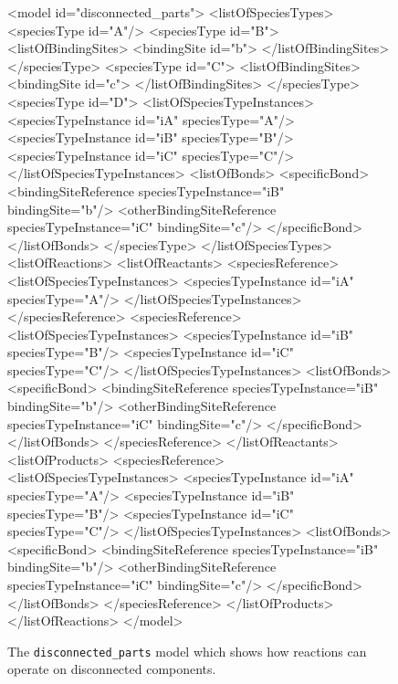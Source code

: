 \documentclass{cekarticle}
\begin{document}
\begin{figure}[h]
\begin{example}
<model id="disconnected_parts">
    <listOfSpeciesTypes>
        <speciesType id="A"/>
        <speciesType id="B">
            <listOfBindingSites>
                <bindingSite id="b">
            </listOfBindingSites>
        </speciesType>
        <speciesType id="C">
            <listOfBindingSites>
                <bindingSite id="c">
            </listOfBindingSites>
        </speciesType>
        <speciesType id="D">
            <listOfSpeciesTypeInstances>
                <speciesTypeInstance id="iA" speciesType="A"/>
                <speciesTypeInstance id="iB" speciesType="B"/>
                <speciesTypeInstance id="iC" speciesType="C"/>
            </listOfSpeciesTypeInstances>
            <listOfBonds>
                <specificBond>
                    <bindingSiteReference speciesTypeInstance="iB" bindingSite="b"/>
                    <otherBindingSiteReference speciesTypeInstance="iC" bindingSite="c"/>
                </specificBond>
            </listOfBonds>
        </speciesType>
    </listOfSpeciesTypes>
    <listOfReactions>
        <listOfReactants>
            <speciesReference>
                <listOfSpeciesTypeInstances>
                    <speciesTypeInstance id="iA" speciesType="A"/>
                 </listOfSpeciesTypeInstances>
            </speciesReference>
            <speciesReference>
                <listOfSpeciesTypeInstances>
                    <speciesTypeInstance id="iB" speciesType="B"/>
                    <speciesTypeInstance id="iC" speciesType="C"/>
                </listOfSpeciesTypeInstances>
                <listOfBonds>
                    <specificBond>
                        <bindingSiteReference speciesTypeInstance="iB" bindingSite="b"/>
                        <otherBindingSiteReference speciesTypeInstance="iC" bindingSite="c"/>
                    </specificBond>
                </listOfBonds>
            </speciesReference>
        </listOfReactants>
        <listOfProducts>
            <speciesReference>
                <listOfSpeciesTypeInstances>
                    <speciesTypeInstance id="iA" speciesType="A"/>
                    <speciesTypeInstance id="iB" speciesType="B"/>
                    <speciesTypeInstance id="iC" speciesType="C"/>
                </listOfSpeciesTypeInstances>
                <listOfBonds>
                    <specificBond>
                        <bindingSiteReference speciesTypeInstance="iB" bindingSite="b"/>
                        <otherBindingSiteReference speciesTypeInstance="iC" bindingSite="c"/>
                    </specificBond>
                </listOfBonds>
            </speciesReference>
        </listOfProducts>
    </listOfReactions>
</model>
\end{example}
  \caption{The \texttt{disconnected\_parts} model which shows how reactions can operate on
  disconnected components.}
  \label{fig:disconnected_parts-xml}
\end{figure}
\end{document}
